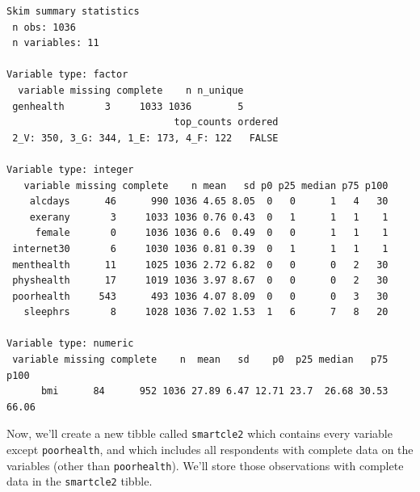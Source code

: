 \documentclass[]{book}
\newenvironment{Shaded}{\begin{snugshade}}{\end{snugshade}}
\newcommand{\KeywordTok}[1]{\textcolor[rgb]{0.13,0.29,0.53}{\textbf{#1}}}
\newcommand{\StringTok}[1]{\textcolor[rgb]{0.31,0.60,0.02}{#1}}
\newcommand{\OperatorTok}[1]{\textcolor[rgb]{0.81,0.36,0.00}{\textbf{#1}}}
\newcommand{\NormalTok}[1]{#1}
\theoremstyle{definition}
\theoremstyle{definition}
\theoremstyle{definition}
\theoremstyle{remark}
\begin{document}
\begin{verbatim}
Skim summary statistics
 n obs: 1036 
 n variables: 11 

Variable type: factor 
  variable missing complete    n n_unique
 genhealth       3     1033 1036        5
                             top_counts ordered
 2_V: 350, 3_G: 344, 1_E: 173, 4_F: 122   FALSE

Variable type: integer 
   variable missing complete    n mean   sd p0 p25 median p75 p100
    alcdays      46      990 1036 4.65 8.05  0   0      1   4   30
    exerany       3     1033 1036 0.76 0.43  0   1      1   1    1
     female       0     1036 1036 0.6  0.49  0   0      1   1    1
 internet30       6     1030 1036 0.81 0.39  0   1      1   1    1
 menthealth      11     1025 1036 2.72 6.82  0   0      0   2   30
 physhealth      17     1019 1036 3.97 8.67  0   0      0   2   30
 poorhealth     543      493 1036 4.07 8.09  0   0      0   3   30
   sleephrs       8     1028 1036 7.02 1.53  1   6      7   8   20

Variable type: numeric 
 variable missing complete    n  mean   sd    p0  p25 median   p75  p100
      bmi      84      952 1036 27.89 6.47 12.71 23.7  26.68 30.53 66.06
\end{verbatim}

Now, we'll create a new tibble called \texttt{smartcle2} which contains
every variable except \texttt{poorhealth}, and which includes all
respondents with complete data on the variables (other than
\texttt{poorhealth}). We'll store those observations with complete data
in the \texttt{smartcle2} tibble.

\begin{Shaded}
\end{Shaded}
\end{document}
